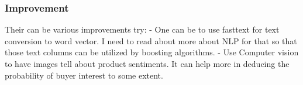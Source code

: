\documentclass[11pt]{article}
\begin{document}
    \subsubsection{Improvement}\label{improvement}

    Their can be various improvements try: - One can be to use fasttext for
text conversion to word vector. I need to read about more about NLP for
that so that those text columns can be utilized by boosting algorithms.
- Use Computer vision to have images tell about product sentiments. It
can help more in deducing the probability of buyer interest to some
extent.


    
    
    
    
\end{document}
